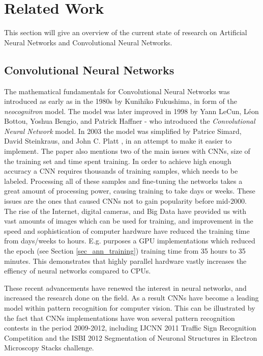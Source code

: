 \chapter{Related Work} \label{chap_related_work}

This section will give an overview of the current state of research on Artificial Neural Networks and Convolutional Neural Networks. 

\section{Convolutional Neural Networks}
The mathematical fundamentals for Convolutional Neural Networks was introduced as early as in the 1980s by Kunihiko Fukushima\cite{Fukushima1980}\cite{Fukushima1982}, in form of the \textit{neocognitron} model. The model was later improved in 1998 by  Yann LeCun, Léon Bottou, Yoshua Bengio, and Patrick Haffner - who introduced the \textit{Convolutional Neural Network} model. In 2003 the model was simplified by Patrice Simard, David Steinkraus, and John C. Platt \cite{Simard2000}, in an attempt to make it easier to implement. The paper also mentions two of the main issues with CNNs, size of the training set and time spent training. In order to achieve high enough accuracy a CNN requires thousands of training samples, which needs to be labeled. Processing all of these samples and fine-tuning the networks takes a great amount of processing power, causing training to take days or weeks. These issues are the ones that caused CNNs not to gain popularity before mid-2000. The rise of the Internet, digital cameras, and Big Data have provided us with vast amounts of images which can be used for training, and improvement in the speed and sophistication of computer hardware have reduced the training time from days/weeks to hours. E.g. \cite{Cires2003} purposes a GPU implementations which reduced the epoch (see Section \ref{sec_ann_training}) training time from 35 hours to 35 minutes. This demonstrates that highly parallel hardware vastly increases the effiency of neural networks compared to CPUs. 

These recent advancements have renewed the interest in neural networks, and increased the research done on the field. As a result CNNs have become a leading model within pattern recognition for computer vision. This can be illustrated by the fact that CNNs implementations have won several pattern recognition contests in the period 2009-2012, including IJCNN 2011 Traffic Sign Recognition Competition\cite{Ciresan2012} and the ISBI 2012 Segmentation of Neuronal Structures in Electron Microscopy Stacks challenge\cite{DanC.Ciresan2012}.


